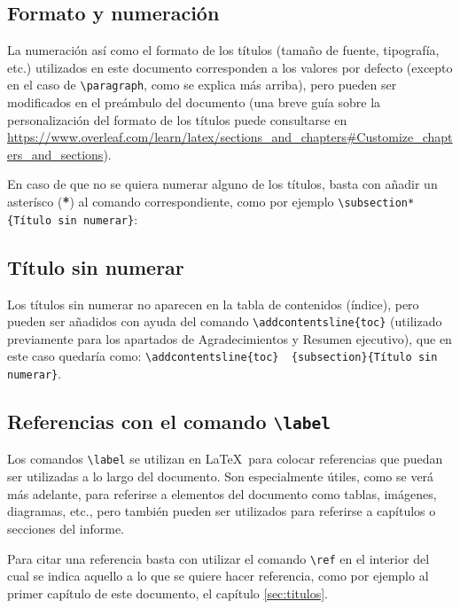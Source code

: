 \subsection{Formato y numeración}

La numeración así como el formato de los títulos (tamaño de fuente, tipografía, etc.) utilizados en este documento corresponden a los valores por defecto (excepto en el caso de \texttt{\textbackslash paragraph}, como se explica más arriba), pero pueden ser modificados en el preámbulo del documento (una breve guía sobre la personalización del formato de los títulos puede consultarse en \url{https://www.overleaf.com/learn/latex/sections_and_chapters#Customize_chapters_and_sections}). 

En caso de que no se quiera numerar alguno de los títulos, basta con añadir un asterísco (\textbf{*}) al comando correspondiente, como por ejemplo \texttt{\textbackslash subsection*\{Título sin numerar\}}:


\subsection*{Título sin numerar} 

Los títulos sin numerar no aparecen en la tabla de contenidos (índice), pero pueden ser añadidos con ayuda del comando \texttt{\textbackslash addcontentsline\{toc\}} (utilizado previamente para los apartados de Agradecimientos y Resumen ejecutivo), que en este caso quedaría como: \texttt{\textbackslash addcontentsline\{toc\} \ \{subsection\}\{Título sin numerar\}}.


\subsection{Referencias con el comando \texttt{\textbackslash label}} \label{sec:referencias}

Los comandos \texttt{\textbackslash label} se utilizan en \LaTeX \ para colocar referencias que puedan ser utilizadas a lo largo del documento. Son especialmente útiles, como se verá más adelante, para referirse a elementos del documento como tablas, imágenes, diagramas, etc., pero también pueden ser utilizados para referirse a capítulos o secciones del informe. 

Para citar una referencia basta con utilizar el comando \texttt{\textbackslash ref} en el interior del cual se indica aquello a lo que se quiere hacer referencia, como por ejemplo al primer capítulo de este documento, el capítulo \ref{sec:titulos}.

